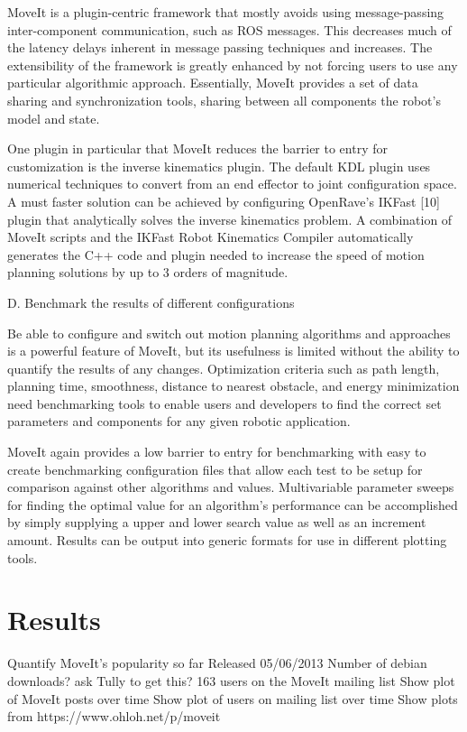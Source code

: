 \documentclass[10pt,journal,compsoc]{joser1}
\begin{document}
{MoveIt is a plugin-centric framework that mostly avoids using message-passing inter-component communication, such as ROS messages. This decreases much of the latency delays inherent in message passing techniques and increases. The extensibility of the framework is greatly enhanced by not forcing users to use any particular algorithmic approach. Essentially, MoveIt provides a set of data sharing and synchronization tools, sharing between all components the robot's model and state.

One plugin in particular that MoveIt reduces the barrier to entry for customization is the inverse kinematics plugin. The default KDL plugin uses numerical techniques to convert from an end effector to joint configuration space. A must faster solution can be achieved by configuring OpenRave's IKFast [10] plugin that analytically solves the inverse kinematics problem. A combination of MoveIt scripts and the IKFast Robot Kinematics Compiler automatically generates the C++ code and plugin needed to increase the speed of motion planning solutions by up to 3 orders of magnitude.

D. Benchmark the results of different configurations

Be able to configure and switch out motion planning algorithms and approaches is a powerful feature of MoveIt, but its usefulness is limited without the ability to quantify the results of any changes. Optimization criteria such as path length, planning time, smoothness, distance to nearest obstacle, and energy minimization need benchmarking tools to enable users and developers to find the correct set parameters and components for any given robotic application.

MoveIt again provides a low barrier to entry for benchmarking with easy to create benchmarking configuration files that allow each test to be setup for comparison against other algorithms and values. Multivariable parameter sweeps for finding the optimal value for an algorithm's performance can be accomplished by simply supplying a upper and lower search value as well as an increment amount. Results can be output into generic formats for use in different plotting tools.

\section{Results}

Quantify MoveIt's popularity so far
Released 05/06/2013
Number of debian downloads? ask Tully to get this?
163 users on the MoveIt mailing list
Show plot of MoveIt posts over time
Show plot of users on mailing list over time
Show plots from https://www.ohloh.net/p/moveit

}
\end{document}
